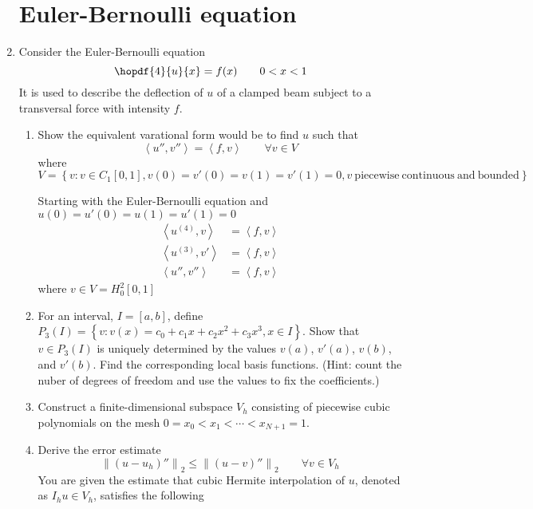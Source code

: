 \documentclass{article}
\newcommand\NoIndent[1]{%
  \begingroup
  \par
  \parshape0
  #1\par
  \endgroup
}
\begin{document}
\begin{enumerate}
\NoIndent{\section{Euler-Bernoulli equation}}

	\item Consider the Euler-Bernoulli equation
		\begin{equation*}
			\hopdf{4}{u}{x} = f(x) \qquad 0 < x < 1
		\end{equation*}
		It is used to describe the deflection of $u$ of a clamped beam
		subject to a transversal force with intensity $f$.
		\begin{enumerate}
			\item Show the equivalent varational form would be to find $u$ such that
				\begin{equation*}
					\left<u'',v''\right> = \left<f,v\right> \qquad \forall v \in V
				\end{equation*}
				where $V = \left\{v:v\in C_1[0,1],v(0)=v'(0)=v(1)=v'(1)=0,
					v\mathrm{\ piecewise\ continuous\ and\ bounded}\right\}$
\NoIndent{
	Starting with the Euler-Bernoulli equation and $u(0)=u'(0)=u(1)=u'(1)=0$
	\begin{align*}
		\left<u^{(4)},v\right> &= \left<f,v\right> \\
		\left<u^{(3)},v'\right> &= \left<f,v\right> \\
		\left<u'',v''\right> &= \left<f,v\right>
	\end{align*}
	where $v \in V = H_0^2[0,1]$
}
			\item For an interval, $I = [a,b]$, define $P_3(I) =
				\left\{v:v(x) = c_0 + c_1 x + c_2 x^2 + c_3 x^3, x \in I\right\}$.
				Show that $v \in P_3(I)$ is uniquely determined by the values
				$v(a)$, $v'(a)$, $v(b)$, and $v'(b)$.
				Find the corresponding local basis functions.
				(Hint: count the nuber of degrees of freedom and use the values to fix the coefficients.)
			\item Construct a finite-dimensional subspace $V_h$ consisting of
				piecewise cubic polynomials on the mesh $0 = x_0 < x_1 < \cdots < x_{N+1} = 1$.
			\item Derive the error estimate
				\begin{equation*}
					\left\|\left(u - u_h\right)''\right\|_2 \leq \left\|\left(u - v\right)''\right\|_2
						\qquad \forall v \in V_h
				\end{equation*}
				You are given the estimate that cubic Hermite interpolation of $u$,
				denoted as $I_h u \in V_h$, satisfies the following

\end{enumerate}
\end{enumerate}
\end{document}
